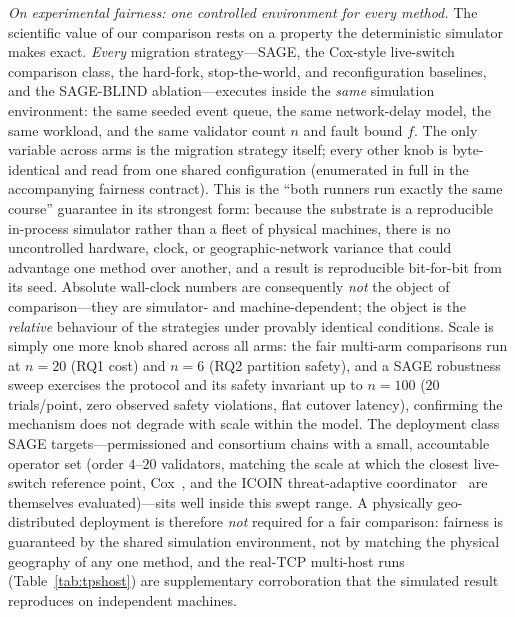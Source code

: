 \documentclass[journal]{IEEEtran}
\theoremstyle{definition}
\theoremstyle{remark}
\begin{document}
\emph{On experimental fairness: one controlled environment for every method.}
The scientific value of our comparison rests on a property the deterministic simulator makes
exact. \emph{Every} migration strategy---SAGE, the Cox-style live-switch comparison class, the hard-fork,
stop-the-world, and reconfiguration baselines, and the SAGE-BLIND ablation---executes inside the
\emph{same} simulation environment: the same seeded event queue, the same network-delay model, the
same workload, and the same validator count $n$ and fault bound $f$. The only variable across arms
is the migration strategy itself; every other knob is byte-identical and read from one shared
configuration (enumerated in full in the accompanying fairness contract).
This is the ``both runners run exactly the same course'' guarantee in its strongest form: because
the substrate is a reproducible in-process simulator rather than a fleet of physical machines,
there is no uncontrolled hardware, clock, or geographic-network variance that could advantage one
method over another, and a result is reproducible bit-for-bit from its seed. Absolute wall-clock
numbers are consequently \emph{not} the object of comparison---they are simulator- and
machine-dependent; the object is the \emph{relative} behaviour of the strategies under provably
identical conditions. Scale is simply one more knob shared across all arms: the fair multi-arm
comparisons run at $n{=}20$ (RQ1 cost) and $n{=}6$ (RQ2 partition safety), and a SAGE robustness
sweep exercises the protocol and its safety invariant up to $n{=}100$ ($20$ trials/point, zero
observed safety violations, flat cutover latency), confirming the mechanism does not degrade with
scale within the model. The deployment class SAGE targets---permissioned and consortium chains with
a small, accountable operator set (order $4$--$20$ validators, matching the scale at which the
closest live-switch reference point, Cox~\cite{cox}, and the ICOIN threat-adaptive
coordinator~\cite{threatadapt} are themselves evaluated)---sits well inside this swept range. A
physically geo-distributed deployment is therefore \emph{not} required for a fair comparison:
fairness is guaranteed by the shared simulation environment, not by matching the physical geography
of any one method, and the real-TCP multi-host runs (Table~\ref{tab:tpshost}) are supplementary
corroboration that the simulated result reproduces on independent machines.
\end{document}
